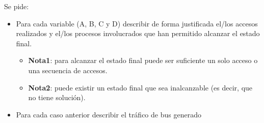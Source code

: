 \medskip

Se pide:
\begin{itemize}

  \item Para cada variable (A, B, C y D) describir de forma justificada el/los
accesos realizados y el/los procesos involucrados que  han permitido alcanzar
el estado final. 

    \begin{itemize}

      \item \textbf{Nota1}: para alcanzar el estado final puede ser suficiente
un solo acceso o una secuencia de accesos. 

      \item \textbf{Nota2}: puede existir un estado final
que sea inalcanzable (es decir, que no tiene solución).

    \end{itemize}

  \item Para cada caso anterior describir el tráfico de bus generado

\end{itemize}

\begin{acsolution}\end{acsolution}


